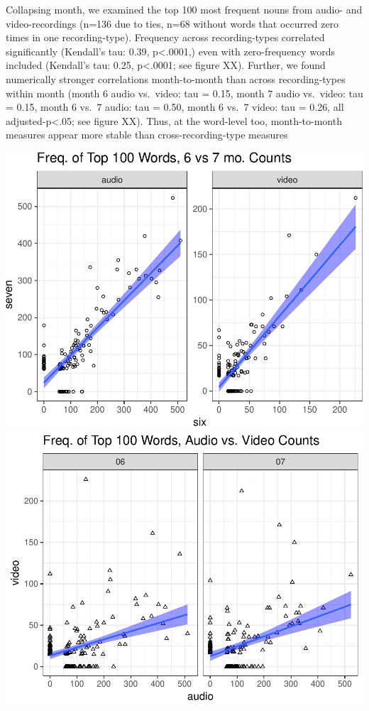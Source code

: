 \documentclass[man]{apa6}
\theoremstyle{definition}
\theoremstyle{definition}
\theoremstyle{definition}
\theoremstyle{remark}
\begin{document}
Collapsing month, we examined the top 100 most frequent nouns from
audio- and video-recordings (n=136 due to ties, n=68 without words that
occurred zero times in one recording-type). Frequency across
recording-types correlated significantly (Kendall's tau: 0.39,
p\textless{}.0001,) even with zero-frequency words included (Kendall's
tau: 0.25, p\textless{}.0001; see figure XX). Further, we found
numerically stronger correlations month-to-month than across
recording-types within month (month 6 audio vs.~video: tau = 0.15, month
7 audio vs.~video: tau = 0.15, month 6 vs.~7 audio: tau = 0.50, month 6
vs.~7 video: tau = 0.26, all adjusted-p\textless{}.05; see figure XX).
Thus, at the word-level too, month-to-month measures appear more stable
than cross-recording-type measures

\includegraphics{sixseven_papaja_files/figure-latex/top100_corgraphs-1.pdf}
\includegraphics{sixseven_papaja_files/figure-latex/top100_corgraphs-2.pdf}
\end{document}
